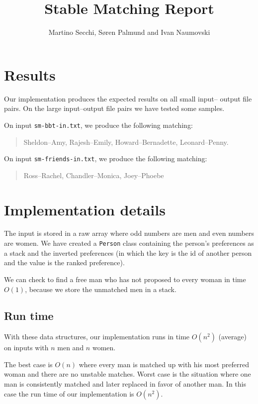 \documentclass{tufte-handout}
\title{Stable Matching Report}
\author{Martino Secchi, Søren Palmund and Ivan Naumovski}
\begin{document}
  \maketitle

  \section{Results}

  Our implementation produces the expected results on all small input--
  output file pairs. On the large input--output file pairs we have tested
  some samples.

  \noindent
  On input {\tt sm-bbt-in.txt}, we produce the following matching:
  \begin{quotation}
    Sheldon--Amy, Rajesh--Emily, Howard--Bernadette, Leonard--Penny.
  \end{quotation}
  
  \noindent
  On input {\tt sm-friends-in.txt}, we produce the following matching:
  \begin{quotation}
  	Ross--Rachel, Chandler--Monica, Joey--Phoebe
  \end{quotation}

  \section{Implementation details}

  The input is stored in a raw array where odd numbers are men and even numbers 
  are women. We have created a {\tt Person} class containing the person's preferences 
  as a stack and the inverted preferences (in which the key is the id of another person 
  and the value is the ranked preference).

  We can check to find a free man who has not proposed to every woman in time $O(1)$, 
  because we store the unmatched men in a stack.
  
  \subsection{Run time}

  With these data structures, our implementation runs in time $O(n^2)$ (average) on 
  inputs with $n$ men and $n$ women.

  The best case is $O(n)$ where every man is matched up with his most preferred woman
  and there are no unstable matches. Worst case is the situation where one man is consistently
  matched and later replaced in favor of another man. In this case the run time of our 
  implementation is $O(n^2)$.
\end{document}
